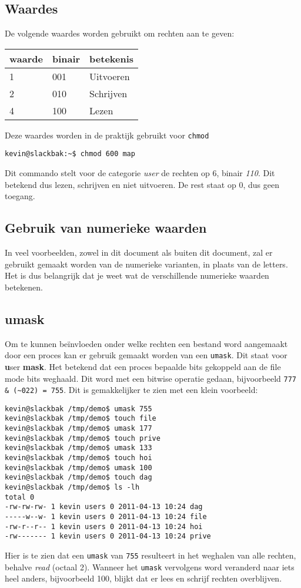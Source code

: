 \subsection{Waardes}
De volgende waardes worden gebruikt om rechten aan te geven:\\
\begin{tabular}[t]{lll}
  \hline
  waarde & binair & betekenis\\
  \hline
  1 & 001 & Uitvoeren\\
  2 & 010 & Schrijven\\
  4 & 100 & Lezen\\
\end{tabular}

Deze waardes worden in de praktijk gebruikt voor \texttt{chmod}
\begin{lstlisting}
kevin@slackbak:~$ chmod 600 map
\end{lstlisting}%
Dit commando stelt voor de categorie \emph{user} de rechten op 6, binair \emph{110}. Dit betekend dus lezen, schrijven en niet uitvoeren. De rest staat op 0, dus geen toegang. 

\subsection{Gebruik van numerieke waarden}
In veel voorbeelden, zowel in dit document als buiten dit document, zal er gebruikt gemaakt worden van de numerieke varianten, in plaats van de letters. Het is dus belangrijk dat je weet wat de verschillende numerieke waarden betekenen. 

\subsection{umask}
Om te kunnen be\"{i}nvloeden onder welke rechten een bestand word aangemaakt door een proces kan er gebruik gemaakt worden van een \texttt{umask}. Dit staat voor \textbf{u}ser \textbf{mask}. Het betekend dat een proces bepaalde bits gekoppeld aan de file mode bits weghaald. Dit word met een bitwise operatie gedaan, bijvoorbeeld \texttt{777 \& (\~{}022) = 755}. Dit is gemakkelijker te zien met een klein voorbeeld:
\begin{lstlisting}
kevin@slackbak /tmp/demo$ umask 755
kevin@slackbak /tmp/demo$ touch file
kevin@slackbak /tmp/demo$ umask 177
kevin@slackbak /tmp/demo$ touch prive
kevin@slackbak /tmp/demo$ umask 133
kevin@slackbak /tmp/demo$ touch hoi
kevin@slackbak /tmp/demo$ umask 100
kevin@slackbak /tmp/demo$ touch dag
kevin@slackbak /tmp/demo$ ls -lh
total 0
-rw-rw-rw- 1 kevin users 0 2011-04-13 10:24 dag
-----w--w- 1 kevin users 0 2011-04-13 10:24 file
-rw-r--r-- 1 kevin users 0 2011-04-13 10:24 hoi
-rw------- 1 kevin users 0 2011-04-13 10:24 prive
\end{lstlisting}%

Hier is te zien dat een \texttt{umask} van \texttt{755} resulteert in het weghalen van alle rechten, behalve \emph{read} (octaal 2). Wanneer het \texttt{umask} vervolgens word veranderd naar iets heel anders, bijvoorbeeld 100, blijkt dat er lees en schrijf rechten overblijven.
